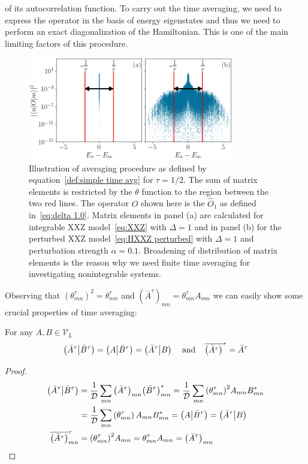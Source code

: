of its autocorrelation function. To carry out the time averaging, we need to express the operator
in the basis of energy eigenstates and thus we need to perform an exact diagonalization of the Hamiltonian.
This is one of the main limiting factors of this procedure.
\begin{figure}[htbp]
  \centering
  \includegraphics[width=0.8\textwidth]{Figures/cutoff_small.png}
  \caption{Illustration of averaging procedure as defined by equation~\eqref{def:simple time avg}
  for \(\tau = 1/2\). The sum
  of matrix elements is restricted by the \(\theta{}\) function to the region between the two red lines. 
  The operator \(O\) shown here is the \(\hat{O}_1\) as defined in~\eqref{eq:delta 1.0}.
  Matrix elements in panel (a) are calculated for integrable XXZ model~\eqref{eq:XXZ} with \(\Delta = 1\) and in
  panel (b) for the perturbed XXZ model~\eqref{eq:HXXZ perturbed} with \(\Delta = 1\) and perturbation strength
  \(\alpha = 0.1\). Broadening of distribution of matrix elements is the reason why we need finite time averaging
  for investigating nonintegrable systems.}
  \label{fig:cutoff}
\end{figure}
Observing that \({\left(\theta_{mn}^{\tau}\right)}^2 = \theta_{mn}^{\tau}\) and \({\left(\bar{A}^{\tau}\right)}_{mn} =
\theta_{mn}^{\tau} A_{mn}\) we can easily show some crucial properties of time averaging:
\begin{proposition}
  For any \(A,B \in \mathcal{V}_L\)
  \begin{equation*}
    \left(\bar{A}^{\tau} \middle| \bar{B}^{\tau}\right) = \left(A \middle| \bar{B}^{\tau}\right) = \left(\bar{A}^{\tau} \middle| B\right)\;\;\;\;
    \textrm{and}\;\;\;\;
    \overline{\left(\bar{A}^{\tau}\right)}^{\tau} = \bar{A}^{\tau}
  \end{equation*}
  \label{prop:projection}
\end{proposition}
\begin{proof}
  \begin{align*}
    \left(\bar{A}^{\tau} \middle| \bar{B}^{\tau}\right)  & = \frac{1}{\mathcal{D}} \sum_{mn} {\left(\bar{A}^{\tau}\right)}_{mn}
    {\left(\bar{B}^{\tau}\right)}_{mn}^{\ast} = \frac{1}{\mathcal{D}} \sum_{mn} {\left(\theta_{mn}^{\tau}\right)}^2 A_{mn} B_{mn}^{\ast} \nonumber{}  \\
    & = \frac{1}{\mathcal{D}} \sum_{mn} \left(\theta_{mn}^{\tau}\right) A_{mn} B_{mn}^{\ast} =
        \left(A \middle| \bar{B}^{\tau}\right) = \left(\bar{A}^{\tau} \middle| B\right)\\
    \overline{\left(\bar{A}^{\tau}\right)}_{mn}^{\tau} & = {\left(\theta_{mn}^{\tau}\right)}^2 A_{mn} = \theta_{mn}^{\tau} A_{mn} = \left(\bar{A}^{\tau}\right)_{mn}
  \end{align*}  
\end{proof}
